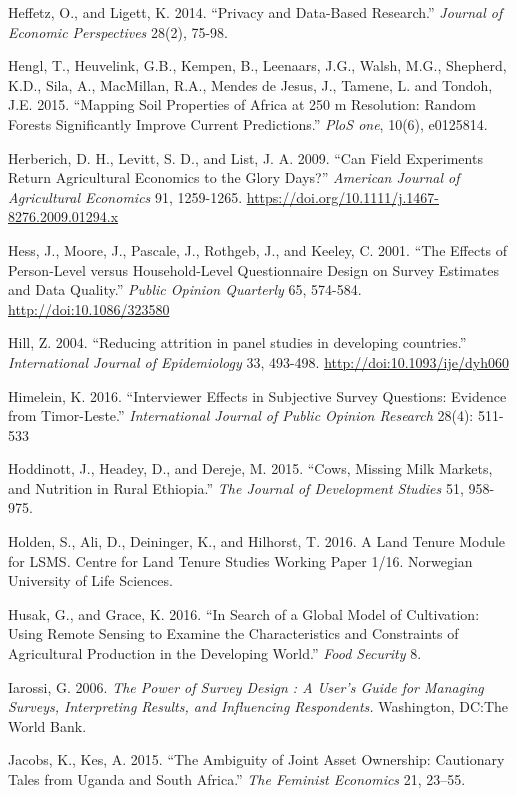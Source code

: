 \documentclass[
]{book}
\begin{document}
Heffetz, O., and Ligett, K. 2014. ``Privacy and Data-Based Research.'' \emph{Journal of Economic Perspectives} 28(2), 75-98.

Hengl, T., Heuvelink, G.B., Kempen, B., Leenaars, J.G., Walsh, M.G., Shepherd, K.D., Sila, A., MacMillan, R.A., Mendes de Jesus, J., Tamene, L. and Tondoh, J.E. 2015. ``Mapping Soil Properties of Africa at 250 m Resolution: Random Forests Significantly Improve Current Predictions.'' \emph{PloS one}, 10(6), e0125814.

Herberich, D. H., Levitt, S. D., and List, J. A. 2009. ``Can Field Experiments Return Agricultural Economics to the Glory Days?'' \emph{American Journal of Agricultural Economics} 91, 1259-1265. \url{https://doi.org/10.1111/j.1467-8276.2009.01294.x}

Hess, J., Moore, J., Pascale, J., Rothgeb, J., and Keeley, C. 2001. ``The Effects of Person-Level versus Household-Level Questionnaire Design on Survey Estimates and Data Quality.'' \emph{Public Opinion Quarterly} 65, 574-584. \url{http://doi:10.1086/323580}

Hill, Z. 2004. ``Reducing attrition in panel studies in developing countries.'' \emph{International Journal of Epidemiology} 33, 493-498. \url{http://doi:10.1093/ije/dyh060}

Himelein, K. 2016. ``Interviewer Effects in Subjective Survey Questions: Evidence from Timor-Leste.'' \emph{International Journal of Public Opinion Research} 28(4): 511-533

Hoddinott, J., Headey, D., and Dereje, M. 2015. ``Cows, Missing Milk Markets, and Nutrition in Rural Ethiopia.'' \emph{The Journal of Development Studies} 51, 958-975.

Holden, S., Ali, D., Deininger, K., and Hilhorst, T. 2016. A Land Tenure Module for LSMS\emph{.} Centre for Land Tenure Studies Working Paper 1/16. Norwegian University of Life Sciences.

Husak, G., and Grace, K. 2016. ``In Search of a Global Model of Cultivation: Using Remote Sensing to Examine the Characteristics and Constraints of Agricultural Production in the Developing World.'' \emph{Food Security} 8.

Iarossi, G. 2006. \emph{The Power of Survey Design : A User's Guide for Managing Surveys, Interpreting Results, and Influencing Respondents.} Washington, DC:The World Bank.

Jacobs, K., Kes, A. 2015. ``The Ambiguity of Joint Asset Ownership: Cautionary Tales from Uganda and South Africa.'' \emph{The Feminist Economics} 21, 23--55.
\end{document}
